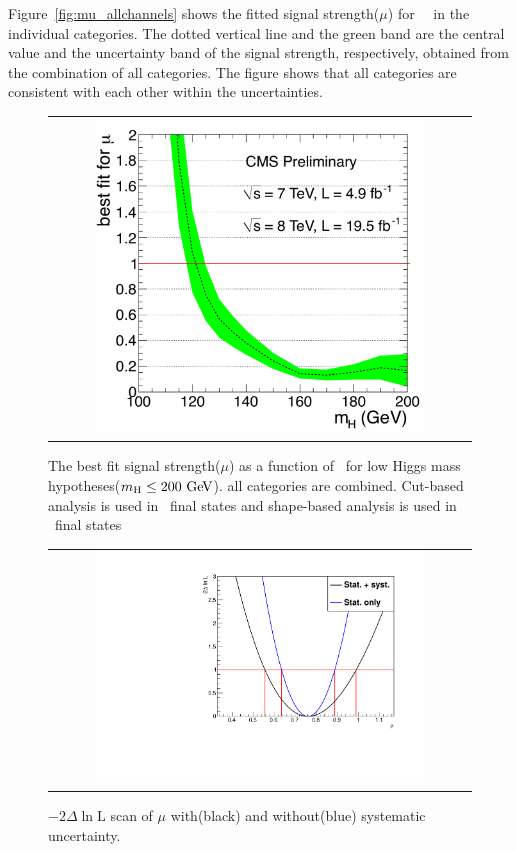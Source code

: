Figure~\ref{fig:mu_allchannels} shows the fitted signal strength($\mu$) 
for ~\GeV\ in the individual categories. 
The dotted vertical line and the green band are 
the central value and the uncertainty band of the signal strength, respectively, 
obtained from the combination of all categories. 
The figure shows that all categories are consistent with each other
within the uncertainties.
%
\begin{figure}[htp] 
\centering 
\begin{tabular}{c} 
\includegraphics[width=0.8\textwidth]{figures/mlf7p8TeV_zoomed.pdf}
\end{tabular} 
\caption{The best fit signal strength($\mu$) as a function of \mHi\ for low Higgs 
mass hypotheses($m_{\mathrm{H}}\le200~\mathrm{Ge\kern -0.1em V}$).
all categories are combined. 
Cut-based analysis is used in \SF\ final states 
and shape-based analysis is used in \DF\ final states} 
\label{fig:mu_mH} 
\end{figure} 
%
\begin{figure}[htp] 
\centering 
\begin{tabular}{c} 
\includegraphics[width=0.8\textwidth]{figures/MuDeltaNLL.pdf}
\end{tabular} 
\caption{ $- 2\Delta\ln \textrm{L}$ scan of $\mu$ with(black) 
and without(blue) systematic uncertainty. }
\label{fig:mu_scan} 
\end{figure} 
